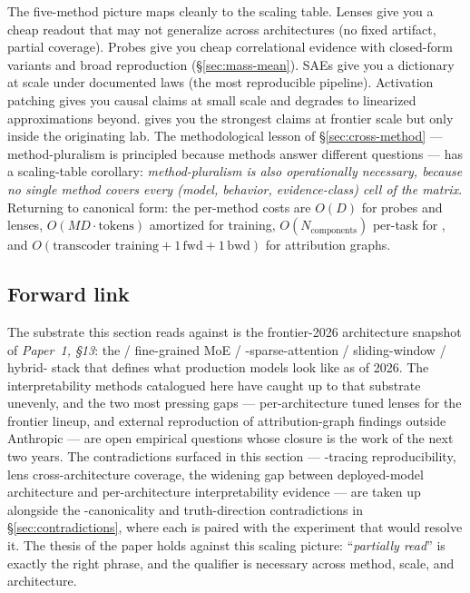 \begin{intuition}
The five-method picture maps cleanly to the scaling table. Lenses give
you a cheap readout that may not generalize across architectures (no
fixed artifact, partial coverage). Probes give you cheap
correlational evidence with closed-form variants and broad reproduction
(\S\ref{sec:mass-mean}). SAEs give you a  dictionary at scale
under documented laws (the most reproducible pipeline). Activation
patching gives you causal claims at small scale and degrades to
linearized approximations beyond.  gives you the
strongest claims at frontier scale but only inside the originating
lab. The methodological lesson of \S\ref{sec:cross-method} ---
method-pluralism is principled because methods answer different
questions --- has a scaling-table corollary: \emph{method-pluralism
is also operationally necessary, because no single method covers every
(model, behavior, evidence-class) cell of the matrix}. Returning to
canonical form: the per-method costs are $O(D)$ for probes and lenses,
$O(M D \cdot \text{tokens})$ amortized for  training,
$O(N_{\mathrm{components}})$ per-task for , and
$O(\text{transcoder training} + 1\,\text{fwd} + 1\,\text{bwd})$ for
attribution graphs.
\end{intuition}

\subsection{Forward link}
\label{sec:scaling-forward}

The substrate this section reads against is the frontier-2026
architecture snapshot of \emph{Paper~1, §13}: the  / fine-grained
MoE / -sparse-attention / sliding-window / hybrid- stack that
defines what production models look like as of 2026. The
interpretability methods catalogued here have caught up to that
substrate unevenly, and the two most pressing gaps --- per-architecture
tuned lenses for the frontier lineup, and external reproduction of
attribution-graph findings outside Anthropic --- are open empirical
questions whose closure is the work of the next two years. The
contradictions surfaced in this section --- -tracing
reproducibility, lens cross-architecture coverage, the widening gap
between deployed-model architecture and per-architecture
interpretability evidence --- are taken up alongside the
-canonicality and truth-direction contradictions in
\S\ref{sec:contradictions}, where each is paired with the experiment
that would resolve it. The thesis of the paper holds against this
scaling picture: ``\emph{partially read}'' is exactly the right
phrase, and the qualifier is necessary across method, scale, and
architecture.
